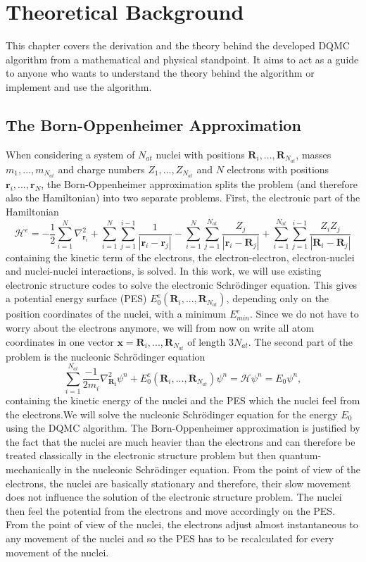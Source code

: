 \documentclass [12pt]{report}
\begin{document}
\chapter{Theoretical Background}
This chapter covers the derivation and the theory behind the developed DQMC algorithm from a mathematical and physical standpoint. It aims to act as a guide to anyone who wants to understand the theory behind the algorithm or implement and use the algorithm.

\section{The Born-Oppenheimer Approximation}
When considering a system of $N_{at}$ nuclei with positions $\bm{R}_i,...,\bm{R}_{N_{at}}$, masses $m_1,...,m_{N_{at}}$ and charge numbers $Z_1,...,Z_{N_{at}}$ and $N$ electrons with positions $\bm{r}_i,...,\bm{r}_{N}$, the Born-Oppenheimer approximation splits the problem (and therefore also the Hamiltonian) into two separate problems. First, the electronic part of the Hamiltonian
\begin{equation}
\mathcal{H}^e = - \frac{1}{2}\sum_{i=1}^N \nabla^2_{\bm{r}_i}  + \sum_{i=1}^{N} \sum_{j=1}^{i-1} \frac{1}{|\bm{r}_i-\bm{r}_j|} - \sum_{i=1}^{N} \sum_{j=1}^{N_{at}} \frac{Z_j}{|\bm{r}_i-\bm{R}_j|} + \sum_{i=1}^{N_{at}} \sum_{j=1}^{i-1} \frac{Z_i Z_j}{|\bm{R}_i-\bm{R}_j|}
\end{equation}
containing the kinetic term of the electrons, the electron-electron, electron-nuclei and nuclei-nuclei interactions, is solved. In this work, we will use existing electronic structure codes to solve the electronic Schrödinger equation. This gives a potential energy surface (PES) $E_0^e(\bm{R}_i,...,\bm{R}_{N_{at}})$, depending only on the position coordinates of the nuclei, with a minimum $E_{min}^e$. Since we do not have to worry about the electrons anymore, we will from now on write all atom coordinates in one vector $\bm{x} = \bm{R}_i,...,\bm{R}_{N_{at}}$ of length $3N_{at}$.
The second part of the problem is the nucleonic Schrödinger equation
\begin{equation} \label{eq:2.2}
\sum_{i=1}^{N_{at}} \frac{-1}{2m_i} \nabla^2_{\bm{R_i}} \psi^n + E_0^e(\bm{R}_i,...,\bm{R}_{N_{at}}) \psi^n = \mathcal{H} \psi^n = E_0 \psi^n,
\end{equation}
containing the kinetic energy of the nuclei and the PES which the nuclei feel from the electrons.We will solve the nucleonic Schrödinger equation for the energy $E_0$ using the DQMC algorithm. The Born-Oppenheimer approximation is justified by the fact that the nuclei are much heavier than the electrons and can therefore be treated classically in the electronic structure problem but then quantum-mechanically in the nucleonic Schrödinger equation. From the point of view of the electrons, the nuclei are basically stationary and therefore, their slow movement does not influence the solution of the electronic structure problem. The nuclei then feel the potential from the electrons and move accordingly on the PES. From the point of view of the nuclei, the electrons adjust almost instantaneous to any movement of the nuclei and so the PES has to be recalculated for every movement of the nuclei.\\
\end{document}
